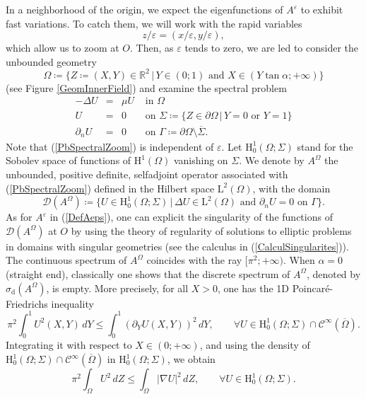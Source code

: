 \documentclass[11pt,a4paper]{article}
\newcommand{\eps}{\varepsilon}
\newcommand{\Om}{\Omega}
\newcommand{\mrm}[1]{\mathrm{#1}}
\newcommand{\R}{\mathbb{R}}
\newcommand{\mL}{\mrm{L}}
\newcommand{\mH}{\mrm{H}}
\begin{document}
\noindent In a neighborhood of the origin, we expect the eigenfunctions of $A^\eps$ to exhibit fast variations. To catch them, we will work with the rapid variables
\[
z/\eps=(x/\eps,y/\eps),
\]
which allow us to zoom at $O$. Then, as $\eps$ tends to zero,
we are led to consider the unbounded geometry 
\[
\Om \coloneqq \{ Z\coloneqq(X,Y)\in \R^2\,|\,Y\in(0;1)\mbox{ and }X\in (Y\tan\alpha;+\infty)\}
\]
(see Figure \ref{GeomInnerField}) and examine the spectral problem 
\begin{equation}\label{PbSpectralZoom}
\begin{array}{|rcll}
-\Delta U&=&\mu U &\mbox{ in }\Om\\[3pt]
U&=&0&\mbox{ on } \Sigma\coloneqq\{ Z\in\partial\Om\,|\,Y = 0\mbox{ or }Y=1\} \\[3pt]
\partial_n U  &=& 0 & \mbox{ on }\Gamma\coloneqq\partial\Om\setminus\overline{\Sigma}.
\end{array}
\end{equation}
Note that (\ref{PbSpectralZoom}) is independent of $\eps$. Let $\mH_0^1(\Om ; \Sigma)$ stand for the Sobolev space of functions of $\mH^1(\Om)$ vanishing on $\Sigma$. We denote by $A^\Om$ the unbounded, positive definite, selfadjoint operator associated with (\ref{PbSpectralZoom}) defined in the Hilbert space $\mL^2(\Om)$, with the domain 
\begin{equation}\label{NearFieldOp}
\mathcal{D}(A^\Om)\coloneqq\{U\in\mH_0^1(\Om ; \Sigma)\,|\,\Delta U\in\mL^2(\Om)\mbox{ and }\partial_n U=0\mbox{ on }\Gamma\}.
\end{equation}
As for $A^\eps$ in (\ref{DefAeps}), one can explicit the singularity of the functions of $\mathcal{D}(A^\Om)$ at $O$ by using the theory of regularity of solutions to elliptic problems in domains with singular geometries (see the calculus in (\ref{CalculSingularites})). The continuous spectrum of $A^\Om$ coincides with the ray $[\pi^2;+\infty)$. When $\alpha = 0$ (straight end), classically one shows that the discrete spectrum of $A^\Om$, denoted by $\sigma_{\mrm{d}}(A^\Om)$, is empty. More precisely, for all $X>0$, one has the 1D Poincar\'e-Friedrichs inequality 
\[
\pi^2\int_{0}^1 U^2(X,Y)\,dY \le \int_{0}^1 (\partial_YU(X,Y))^2\,dY,\qquad\forall U\in\mH_0^1(\Om ; \Sigma)\cap\mathscr{C}^\infty(\overline{\Om}).
\]
Integrating it with respect to $X\in(0;+\infty)$, and using the density of $\mH_0^1(\Om ; \Sigma)\cap\mathscr{C}^\infty(\overline{\Om})$ in $\mH_0^1(\Om ; \Sigma)$, we obtain
\[
\pi^2\int_{\Om} U^2\,dZ \le \int_{\Om} |\nabla U|^2\,dZ,\qquad\forall U\in\mH_0^1(\Om ; \Sigma).
\]
\end{document}
